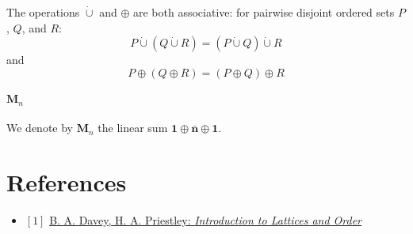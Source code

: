 \documentclass[12pt, letterpaper, oneside]{book}
\begin{document}
The operations $\dot{\cup}$ and $\oplus$ are both associative: for pairwise disjoint ordered sets $P$, $Q$, and $R$:
\[P \dot{\cup} (Q \dot{\cup} R) = (P \dot{\cup} Q) \dot{\cup} R\]
and
\[P \oplus (Q \oplus R) = (P \oplus Q) \oplus R\]

\subsubsection{$\mathbf{M}_n$}

We denote by $\mathbf{M}_n$ the linear sum $\mathbf{1} \oplus \bar{\mathbf{n}} \oplus \mathbf{1}$.

%
%

\chapter*{References}

\begin{itemize}
  \item $[1]$ \href{https://www.cambridge.org/core/books/introduction-to-lattices-and-order/946458CB6638AF86D85BA00F5787F4F4}{B. A. Davey, H. A. Priestley: \it{Introduction to Lattices and Order}}
\end{itemize}
\end{document}
